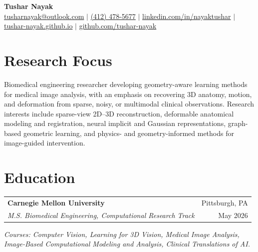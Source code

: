 \documentclass[letterpaper,10pt]{article}
\newcommand{\cvSubheading}[4]{
    \vspace{1pt}
    \begin{tabularx}{\textwidth}{X r}
        \textbf{#1} & #2 \\
        \textit{\small #3} & \small #4 \\
    \end{tabularx}
    \vspace{-3pt}
}
\begin{document}

\begin{center}
    {\Huge \textbf{Tushar Nayak}} \\[-1pt]

    \small
    \href{mailto:tusharnayak@outlook.com}{tusharnayak@outlook.com}
    $|$
    \href{tel:+14124785677}{(412) 478-5677}
    $|$
    \href{https://linkedin.com/in/nayaktushar}{linkedin.com/in/nayaktushar}
    $|$
    \href{https://tushar-nayak.github.io}{tushar-nayak.github.io}
    $|$
    \href{https://github.com/tushar-nayak}{github.com/tushar-nayak}
\end{center}

\vspace{-6pt}



\section{Research Focus}

\small{
Biomedical engineering researcher developing geometry-aware learning methods
for medical image analysis, with an emphasis on recovering 3D anatomy, motion,
and deformation from sparse, noisy, or multimodal clinical observations.
Research interests include sparse-view 2D--3D reconstruction, deformable
anatomical modeling and registration, neural implicit and Gaussian
representations, graph-based geometric learning, and physics- and
geometry-informed methods for image-guided intervention.
}



\section{Education}

\cvSubheading
    {Carnegie Mellon University}
    {Pittsburgh, PA}
    {M.S. Biomedical Engineering, Computational Research Track}
    {May 2026}

\small{
\textit{Courses:
Computer Vision, Learning for 3D Vision, Medical Image Analysis,
Image-Based Computational Modeling and Analysis, Clinical Translations of AI.
}}
\end{document}
